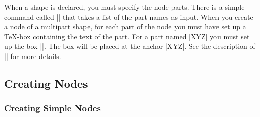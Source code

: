 When a shape is declared, you must specify the node parts. There is a
simple command called |\nodeparts| that takes a list of the part names
as input. When you create a node of a multipart shape, for each part
of the node you must have set up a \TeX-box containing the text of the
part. For a part named |XYZ| you must set up the box
|\pgfnodepartXYZbox|. The box will be placed at the anchor |XYZ|. See
the description of |\pgfmultipartnode| for more details.


\subsection{Creating Nodes}


\subsubsection{Creating Simple Nodes}

